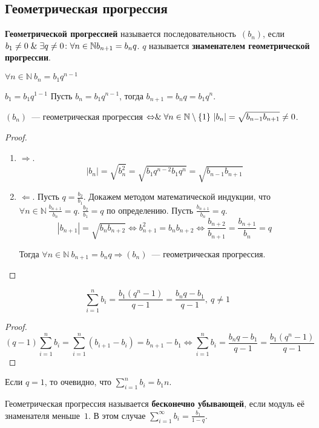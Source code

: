\subsection{Геометрическая прогрессия}
 \textbf{Геометрической прогрессией} называется последовательность~$(b_n)$, если $b_1 \neq 0 \lAnd \exists q \neq 0 \colon \allowbreak \forall n \in \mathbb N \allowbreak b_{n+1} \opbr= b_n q$.
$q$ называется \textbf{знаменателем геометрической прогрессии}.

\begin{statement}
$\forall n \in \mathbb N \ b_n = b_1 q^{n-1}$
\end{statement}
\begin{proofmathind}
	\indbase $b_1 = b_1 q^{1-1}$
	\indstep Пусть $b_n = b_1 q^{n-1}$, тогда $b_{n+1} = b_n q = b_1 q^n$. \indend
\end{proofmathind}

\begin{theorem}
$(b_n)$~--- геометрическая прогрессия $\Leftrightarrow \mathrel{\&} \forall n \in \mathbb N \setminus \{ 1 \} \ |b_n| = \sqrt{b_{n-1} b_{n+1}} \neq 0$.
\end{theorem}
\begin{proof}
\begin{enumerate}
	\item $\Rightarrow$.
	\begin{equation*}
	|b_n| = \sqrt{b_n^2} =
	\sqrt{b_1 q^{n-2} b_1 q^n} =
	\sqrt{b_{n-1} b_{n+1}}
	\end{equation*}
	
	\item $\Leftarrow$. Пусть $q = \frac{b_2}{b_1}$.
	Докажем методом математической индукции, что $\forall n \in \mathbb N \ \frac{b_{n+1}}{b_n} = q$.
		\indbase $\frac{b_2}{b_1} = q$ по определению.
		\indstep Пусть $\frac{b_{n+1}}{b_n} = q$.
		\begin{equation*}
		|b_{n+1}| = \sqrt{b_n b_{n+2}} \Leftrightarrow
		b_{n+1}^2 = b_n b_{n+2} \Leftrightarrow
		\frac{b_{n+2}}{b_{n+1}} = \frac{b_{n+1}}{b_n} = q
		\end{equation*}
		\indend
		
	Тогда $\forall n \in \mathbb N \ b_{n+1} = b_n q \Rightarrow (b_n)$~--- геометрическая прогрессия.
\end{enumerate}
\end{proof}

\begin{theorem}
\begin{equation*}
\sum_{i=1}^n b_i = \frac{b_1(q^n - 1)}{q - 1} = \frac{b_n q - b_1}{q - 1}, \ q \neq 1
\end{equation*}
\end{theorem}
\begin{proof}
\begin{equation*}
(q - 1) \sum_{i=1}^n b_i =
\sum_{i=1}^n (b_{i+1} - b_i) =
b_{n+1} - b_1 \Leftrightarrow
\sum_{i=1}^n b_i = \frac{b_n q - b_1}{q - 1} = \frac{b_1(q^n - 1)}{q - 1}
\end{equation*}
\end{proof}

Если $q = 1$, то очевидно, что $\displaystyle \sum_{i=1}^n b_i = b_1 n$.

Геометрическая прогрессия называется \textbf{бесконечно убывающей}, если модуль её знаменателя меньше~$1$.
В этом случае $\displaystyle \sum_{i=1}^\infty b_i = \frac{b_1}{1 - q}$.